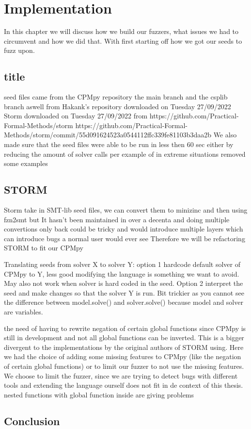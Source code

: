 \chapter{Implementation}
\label{cha:impl}
\label{impl:Intro}
In this chapter we will discuss how we build our fuzzers, what issues we had to circumvent and how we did that. With first starting off how we got our seeds to fuzz upon.

\section{title}
\label{impl:seeds}


seed files came from the CPMpy repository the main branch and the csplib branch aswell from Hakank's repository downloaded on Tuesday 27/09/2022
Storm downloaded on Tuesday 27/09/2022 from https://github.com/Practical-Formal-Methods/storm 
https://github.com/Practical-Formal-Methods/storm/commit/55d091624523a0544112ffc339fe81103b3daa2b
We also made sure that the seed files were able to be run in less then 60 sec either by reducing the amount of solver calls per example of in extreme situations removed some examples



\section{STORM}
Storm take in SMT-lib seed files, we can convert them to minizinc and then using fzn2smt but It hasn't been maintained in over a decenta and doing multiple convertions only back could be tricky and would introduce multiple layers which can introduce bugs a normal user would ever see
Therefore we will be refactoring STORM to fit our CPMpy


Translating seeds from solver X to solver Y: 
option 1 hardcode default solver of CPMpy to Y, less good modifying the language is something we want to avoid. May also not work when solver is hard coded in the seed.
Option 2 interpret the seed and make changes so that the solver Y is run. Bit trickier as you cannot see the difference between model.solve() and solver.solve() because model and solver are variables.



the need of having to rewrite negation of certain global functions since CPMpy is still in development and not all global functions can be inverted. This is a bigger divergent to the implementations by the original authors of STORM using. Here we had the choice of adding some missing features to CPMpy (like the negation of certain global functions) or to limit our fuzzer to not use the missing features. We choose to limit the fuzzer, since we are trying to detect bugs with different tools and extending the language ourself does not fit in de context of this thesis.
nested functions with global function inside are giving problems


\section{Conclusion}
\label{impl:conclusion}

